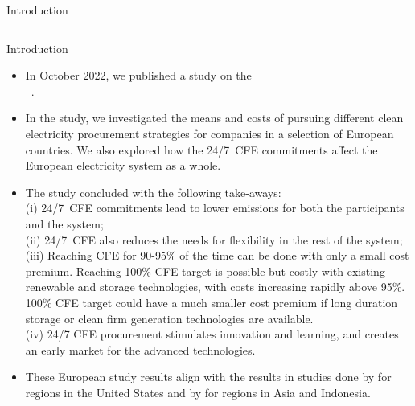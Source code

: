 \begin{frame}{Introduction}
{\begin{columns}[T]
  \end{columns}

  }
\end{frame}


\begin{frame}{Introduction}

  {\footnotesize
  \begin{itemize}
  \item In October 2022, we published a study on the  \\
  \faGithub~. 
  
  \item In the study, we investigated the \alert{means and costs} of pursuing different clean electricity procurement strategies for companies in a selection of European countries. We also explored how the 24/7~CFE commitments \alert{affect the European electricity system} as a whole. 
  
  \item The study concluded with the following take-aways: \\ 
  (i) 24/7~CFE commitments lead to lower emissions for both the
  participants and the system;\\ 
  (ii) 24/7~CFE also reduces the needs for flexibility in the rest of the system; \\ 
  (iii) Reaching CFE for 90-95\% of the time can be done with only a small cost premium. Reaching 100\% CFE target is possible but costly with existing renewable and storage technologies, with costs increasing rapidly above 95\%. 100\% CFE target could have a much smaller cost premium if long duration storage or clean firm generation technologies are available. \\ 
  (iv) 24/7 CFE procurement stimulates innovation and learning, and creates an early market for the advanced technologies.

  \item  These European study results align with the results in studies done by  for regions in the United States and by  for regions in Asia and Indonesia.

  \end{itemize}
  }

\end{frame}
  


